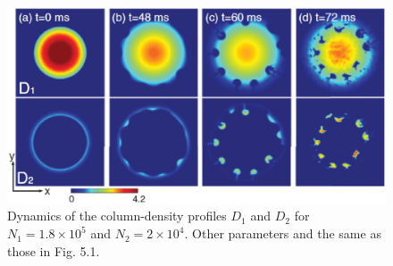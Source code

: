 \documentclass[12pt,a4paper]{report} %
\begin{document}
\begin{figure}[htbp]
\begin{center}
\includegraphics[scale=0.5,keepaspectratio]{5-2.eps}
\caption{
Dynamics of the column-density profiles
$D_1$ and $D_2$ for $N_1 = 1.8 \times 10^5$ and $N_2 = 2 \times 10^4$. Other parameters
and the same as those in Fig. 5.1.
}
\label{FIG:5-2}
\end{center}
\end{figure}
\end{document}
